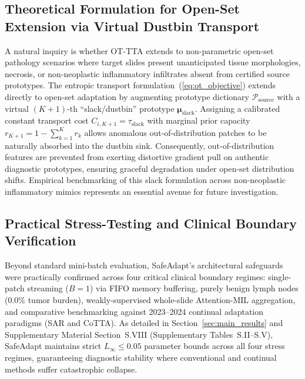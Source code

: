 \documentclass[journal]{IEEEtran}
\begin{document}
\subsection{Theoretical Formulation for Open-Set Extension via Virtual Dustbin Transport}
A natural inquiry is whether OT-TTA extends to non-parametric open-set pathology scenarios where target slides present unanticipated tissue morphologies, necrosis, or non-neoplastic inflammatory infiltrates absent from certified source prototypes. The entropic transport formulation~(\ref{eq:ot_objective}) extends directly to open-set adaptation by augmenting prototype dictionary $\mathcal{P}_{\text{source}}$ with a virtual $(K+1)$-th ``slack/dustbin'' prototype $\boldsymbol{\mu}_{\text{slack}}$. Assigning a calibrated constant transport cost $C_{i, K+1} = \tau_{\text{slack}}$ with marginal prior capacity $r_{K+1} = 1 - \sum_{k=1}^K r_k$ allows anomalous out-of-distribution patches to be naturally absorbed into the dustbin sink. Consequently, out-of-distribution features are prevented from exerting distortive gradient pull on authentic diagnostic prototypes, ensuring graceful degradation under open-set distribution shifts. Empirical benchmarking of this slack formulation across non-neoplastic inflammatory mimics represents an essential avenue for future investigation.

\subsection{Practical Stress-Testing and Clinical Boundary Verification}
Beyond standard mini-batch evaluation, SafeAdapt's architectural safeguards were practically confirmed across four critical clinical boundary regimes: single-patch streaming ($B=1$) via FIFO memory buffering, purely benign lymph nodes (0.0\% tumor burden), weakly-supervised whole-slide Attention-MIL aggregation, and comparative benchmarking against 2023--2024 continual adaptation paradigms (SAR and CoTTA). As detailed in Section~\ref{sec:main_results} and Supplementary Material Section~S.VIII (Supplementary Tables~S.II--S.V), SafeAdapt maintains strict $L_\infty \le 0.05$ parameter bounds across all four stress regimes, guaranteeing diagnostic stability where conventional and continual methods suffer catastrophic collapse.
\end{document}
